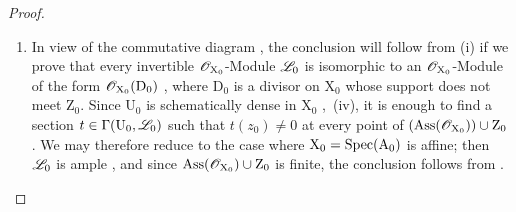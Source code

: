 \begin{proof}
\begin{enumerate}[label=(\roman*)]
By virtue of the choice of $\mathrm{U}^{(x)}$, we can define a divisor $\mathrm{D}'^{(x)}$ on $\mathrm{U}^{(x)}$ by $\mathrm{D}'^{(x)}=\operatorname{div}(g^{(x)})$;
moreover we have seen above that $x$ is necessarily isolated in $\mathrm{V}^{(x)}\cap\mathrm{X}_0$, hence, by again replacing $\mathrm{U}^{(x)}$ by a smaller open neighbourhood of $x$, we can suppose that $\mathrm{V}^{(x)}\cap\mathrm{X}_0$ is reduced to the point $x$.
But there then exists, by virtue of condition $2^{\mathrm{o}}$, a part $\mathrm{W}^{(x)}$ of $\mathrm{V}^{(x)}$, closed in $\mathrm{X}$ and open in $\mathrm{V}^{(x)}$, such that $\mathrm{W}^{(x)}\cap\mathrm{X}_0=\{x\}$.
Replacing $\mathrm{U}^{(x)}$ once more by a smaller open neighbourhood of $x$, we can therefore suppose
that $\mathrm{W}^{(x)}=\mathrm{V}^{(x)}$, in other words that $\mathrm{V}^{(x)}$ is \emph{closed in} $\mathrm{X}$.
We can then define a divisor $\mathrm{D}^{(x)}$ \emph{on} $\mathrm{X}$ by the condition that $\mathrm{D}^{(x)}|\mathrm{U}^{(x)}=\mathrm{D}'^{(x)}$ and $\mathrm{D}^{(x)}|(\mathrm{X}\setmin\mathrm{V}^{(x)})=0$, which makes sense since in $\mathrm{U}^{(x)}\cap(\mathrm{X}\setmin\mathrm{V}^{(x)})$ the restriction of $g^{(x)}$ is an \emph{invertible} section, hence the restrictions to this open set of the two divisors considered on $\mathrm{U}^{(x)}$ and on $\mathrm{X}\setmin\mathrm{V}^{(x)}$ are equal.
It then suffices, to answer the question, to take $\mathrm{D}=\sum_{x\in\mathrm{T}}\mathrm{D}^{(x)}$, which makes sense since $\mathrm{T}$ is finite.

  \item In view of the commutative diagram , the conclusion will follow from (i) if we prove that every invertible $\mathscr{O}_{\mathrm{X}_0}$-Module $\mathscr{L}_0$ is isomorphic to an $\mathscr{O}_{\mathrm{X}_0}$-Module of the form $\mathscr{O}_{\mathrm{X}_0}(\mathrm{D}_0)$ , where $\mathrm{D}_0$ is a divisor on $\mathrm{X}_0$ whose support does not meet $\mathrm{Z}_0$.
Since $\mathrm{U}_0$ is schematically dense in $\mathrm{X}_0$ ,{}~(iv), it is enough  to find a section $t\in\Gamma(\mathrm{U}_0,\mathscr{L}_0)$ such that $t(z_0)\neq0$ at every point of $(\operatorname{Ass}(\mathscr{O}_{\mathrm{X}_0}))\cup\mathrm{Z}_0$.
We may therefore reduce to the case where $\mathrm{X}_0=\operatorname{Spec}(\mathrm{A}_0)$ is affine; then $\mathscr{L}_0$ is ample , and since $\operatorname{Ass}(\mathscr{O}_{\mathrm{X}_0})\cup\mathrm{Z}_0$ is finite, the conclusion follows from .
\end{enumerate}
\end{proof}

